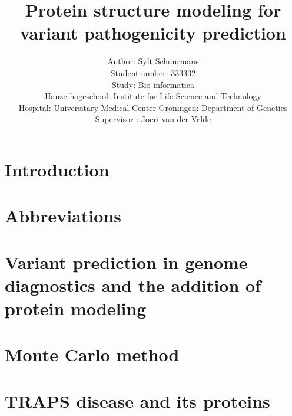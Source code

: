 \documentclass[10pt]{article}
\begin{document}
	\title{Protein structure modeling for variant pathogenicity prediction}
	\author{Author: Sylt Schuurmans\\
		Studentnumber: 333332\\
		Study: Bio-informatica\\
		Hanze hogeschool: Institute for Life Science and Technology\\
		Hospital: Universitary Medical Center Groningen: Department of Genetics\\
		Supervisor : Joeri van der Velde}
	\maketitle
	\newpage
	
	
	\section*{Introduction}
	
	\label{section:Chap_Introduction}
	\newpage
	
	\section*{Abbreviations}
	
	\label{section:Chap_Abbreviations}
	\newpage
	
	\tableofcontents
	\newpage
	
	\listoffigures
	\newpage
	
	\listoftables
	\newpage
	
	
	\section{Variant prediction in genome diagnostics and the addition of protein modeling}
	
	\label{section:Chap_Variant_Prediction_In_Genome_Diagnostics}
	\newpage
	
	\section{Monte Carlo method}
	
	\label{section:Chap_Monte_Carlo}
	\newpage
	
	\section{TRAPS disease and its proteins}
	
	\label{section:Chap_Cell_Death}
	\newpage
	
\end{document}
